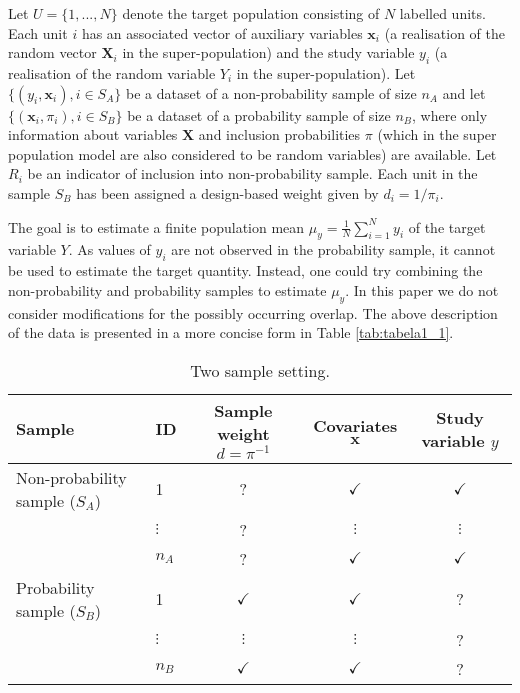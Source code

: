 \documentclass[
]{jss}
\begin{document}
Let \(U=\{1,..., N\}\) denote the target population consisting of \(N\)
labelled units. Each unit \(i\) has an associated vector of auxiliary
variables \(\boldsymbol{x}_{i}\) (a realisation of the random vector
\(\boldsymbol{X}_{i}\) in the super-population) and the study variable
\(y_{i}\) (a realisation of the random variable \(Y_{i}\) in the
super-population). Let \(\{ (y_i, \boldsymbol{x}_i), i \in S_A\}\) be a
dataset of a non-probability sample of size \(n_A\) and let
\(\{\left(\boldsymbol{x}_i, \pi_{i}\right), i \in S_B\}\) be a dataset
of a probability sample of size \(n_B\), where only information about
variables \(\boldsymbol{X}\) and inclusion probabilities \(\pi\) (which
in the super population model are also considered to be random
variables) are available. Let \(R_i\) be an indicator of inclusion into
non-probability sample. Each unit in the sample \(S_B\) has been
assigned a design-based weight given by \(d_i = 1/\pi_i\).

The goal is to estimate a finite population mean
\(\displaystyle\mu_{y}=\frac{1}{N}\sum_{i=1}^{N} y_{i}\) of the target
variable \(Y\). As values of \(y_{i}\) are not observed in the
probability sample, it cannot be used to estimate the target quantity.
Instead, one could try combining the non-probability and probability
samples to estimate \(\mu_{y}\). In this paper we do not consider
modifications for the possibly occurring overlap. The above description
of the data is presented in a more concise form in Table
\ref{tab:tabela1_1}.

\begin{table}[H]
    \centering
    \begin{tabular}{llccc} 
    \hline
    Sample & ID & Sample weight $d=\pi^{-1}$ & Covariates $\boldsymbol{x}$ & Study variable $y$ \\
    \hline
    Non-probability sample ($S_A$) & 1 & ? & $\checkmark$ & $\checkmark$ \\ 
    & $\vdots$ & ? & $\vdots$ & $\vdots$ \\
    & $n_A$ & ? & $\checkmark$ & $\checkmark$ \\
    Probability sample ($S_B$) & 1 & $\checkmark$ & $\checkmark$ & ? \\
    & $\vdots$ & $\vdots$ & $\vdots$ & ? \\ 
    & $n_B$ & $\checkmark$ & $\checkmark$ & ? \\                                     
    \hline     
    \end{tabular}
    \caption{Two sample setting.}
    \label{tab-two-sources}
\end{table}
\end{document}
